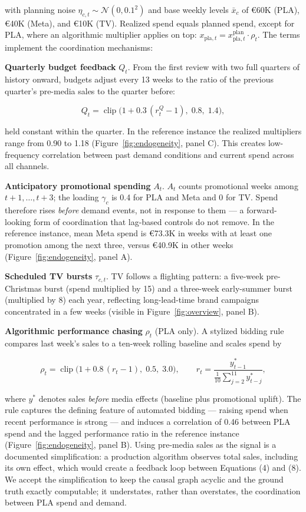 \documentclass[
  conference]{IEEEtran}
\begin{document}
with planning noise \(\eta_{c,t} \sim \mathcal{N}(0, 0.1^2)\) and base
weekly levels \(\bar{x}_c\) of €60K (PLA), €40K (Meta), and €10K (TV).
Realized spend equals planned spend, except for PLA, where an
algorithmic multiplier applies on top:
\(x_{\text{pla},t} = x^{\text{plan}}_{\text{pla},t} \cdot \rho_t\). The
terms implement the coordination mechanisms:

\textbf{Quarterly budget feedback} \(Q_t\). From the first review with
two full quarters of history onward, budgets adjust every 13 weeks to
the ratio of the previous quarter's pre-media sales to the quarter
before:

\[Q_t = \operatorname{clip}\!\big(1 + 0.3\,(r^{Q}_t - 1),\; 0.8,\; 1.4\big), \tag{5}\]

held constant within the quarter. In the reference instance the realized
multipliers range from 0.90 to 1.18 (Figure~\ref{fig:endogeneity}, panel
C). This creates low-frequency correlation between past demand
conditions and current spend across all channels.

\textbf{Anticipatory promotional spending} \(A_t\). \(A_t\) counts
promotional weeks among \(t+1, \dots, t+3\); the loading \(\gamma_c\) is
0.4 for PLA and Meta and 0 for TV. Spend therefore rises \emph{before}
demand events, not in response to them --- a forward-looking form of
coordination that lag-based controls do not remove. In the reference
instance, mean Meta spend is €73.3K in weeks with at least one promotion
among the next three, versus €40.9K in other weeks
(Figure~\ref{fig:endogeneity}, panel A).

\textbf{Scheduled TV bursts} \(\tau_{c,t}\). TV follows a flighting
pattern: a five-week pre-Christmas burst (spend multiplied by 15) and a
three-week early-summer burst (multiplied by 8) each year, reflecting
long-lead-time brand campaigns concentrated in a few weeks (visible in
Figure~\ref{fig:overview}, panel B).

\textbf{Algorithmic performance chasing} \(\rho_t\) (PLA only). A
stylized bidding rule compares last week's sales to a ten-week rolling
baseline and scales spend by

\[\rho_t = \operatorname{clip}\!\big(1 + 0.8\,(r_t - 1),\; 0.5,\; 3.0\big), \qquad r_t = \frac{y^{\ast}_{t-1}}{\tfrac{1}{10}\sum_{j=2}^{11} y^{\ast}_{t-j}}, \tag{6}\]

where \(y^{\ast}\) denotes sales \emph{before} media effects (baseline
plus promotional uplift). The rule captures the defining feature of
automated bidding --- raising spend when recent performance is strong
--- and induces a correlation of 0.46 between PLA spend and the lagged
performance ratio in the reference instance
(Figure~\ref{fig:endogeneity}, panel B). Using pre-media sales as the
signal is a documented simplification: a production algorithm observes
total sales, including its own effect, which would create a feedback
loop between Equations (4) and (8). We accept the simplification to keep
the causal graph acyclic and the ground truth exactly computable; it
understates, rather than overstates, the coordination between PLA spend
and demand.
\end{document}
